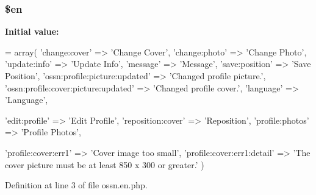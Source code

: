 \subsubsection[{\texorpdfstring{\$en}{$en}}]{\setlength{\rightskip}{0pt plus 5cm}\$en}\hypertarget{components_2_ossn_profile_2locale_2ossn_8en_8php_a48abc714dfb71c8fffa83cf49f452115}{}\label{components_2_ossn_profile_2locale_2ossn_8en_8php_a48abc714dfb71c8fffa83cf49f452115}
{\bfseries Initial value\+:}
\begin{DoxyCode}
= array(
        \textcolor{stringliteral}{'change:cover'} => \textcolor{stringliteral}{'Change Cover'},
        \textcolor{stringliteral}{'change:photo'} => \textcolor{stringliteral}{'Change Photo'},
        \textcolor{stringliteral}{'update:info'} => \textcolor{stringliteral}{'Update Info'},
        \textcolor{stringliteral}{'message'} => \textcolor{stringliteral}{'Message'},
        \textcolor{stringliteral}{'save:position'} => \textcolor{stringliteral}{'Save Position'},
        \textcolor{stringliteral}{'ossn:profile:picture:updated'} => \textcolor{stringliteral}{'Changed profile picture.'},
        \textcolor{stringliteral}{'ossn:profile:cover:picture:updated'} => \textcolor{stringliteral}{'Changed profile cover.'},
        \textcolor{stringliteral}{'language'} => \textcolor{stringliteral}{'Language'},
        
        \textcolor{stringliteral}{'edit:profile'} => \textcolor{stringliteral}{'Edit Profile'},
        \textcolor{stringliteral}{'reposition:cover'} => \textcolor{stringliteral}{'Reposition'},
        \textcolor{stringliteral}{'profile:photos'} => \textcolor{stringliteral}{'Profile Photos'},
        
        \textcolor{stringliteral}{'profile:cover:err1'} => \textcolor{stringliteral}{'Cover image too small'},
        \textcolor{stringliteral}{'profile:cover:err1:detail'} => \textcolor{stringliteral}{'The cover picture must be at least 850 x 300 or greater.'}
)
\end{DoxyCode}


Definition at line 3 of file ossn.\+en.\+php.

